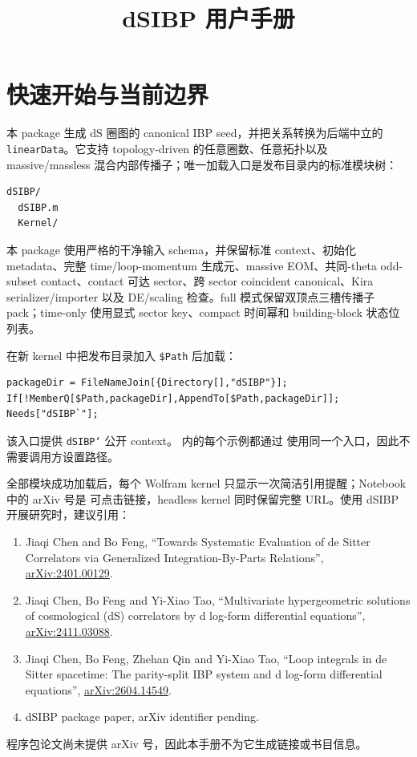 ﻿\documentclass[a4paper,11pt]{article}
\title{dSIBP 用户手册}
\begin{document}
\sloppy
\setcounter{tocdepth}{1}
\maketitle
\newpage

\section{快速开始与当前边界}

本 package 生成 dS 圈图的 canonical IBP seed，并把关系转换为后端中立的 \texttt{linearData}。它支持 topology-driven 的任意圈数、任意拓扑以及 massive/massless 混合内部传播子；唯一加载入口是发布目录内的标准模块树：
\begin{verbatim}
dSIBP/
  dSIBP.m
  Kernel/
\end{verbatim}
本 package 使用严格的干净输入 schema，并保留标准 context、初始化 metadata、完整 time/loop-momentum 生成元、massive EOM、共同-theta odd-subset contact、contact 可达 sector、跨 sector coincident canonical、Kira serializer/importer 以及 DE/scaling 检查。full 模式保留双顶点三槽传播子 pack；time-only 使用显式 sector key、compact 时间幂和 building-block 状态位列表。

在新 kernel 中把发布目录加入 \texttt{\$Path} 后加载：
\begin{verbatim}
packageDir = FileNameJoin[{Directory[],"dSIBP"}];
If[!MemberQ[$Path,packageDir],AppendTo[$Path,packageDir]];
Needs["dSIBP`"];
\end{verbatim}
该入口提供 \texttt{dSIBP`} 公开 context。 内的每个示例都通过
 使用同一个入口，因此不需要调用方设置路径。

全部模块成功加载后，每个 Wolfram kernel 只显示一次简洁引用提醒；Notebook 中的 arXiv 号是
可点击链接，headless kernel 同时保留完整 URL。使用 dSIBP 开展研究时，建议引用：
\begin{enumerate}
  \item Jiaqi Chen and Bo Feng, ``Towards Systematic Evaluation of de Sitter Correlators via Generalized Integration-By-Parts Relations'', \href{https://arxiv.org/abs/2401.00129}{arXiv:2401.00129}.
  \item Jiaqi Chen, Bo Feng and Yi-Xiao Tao, ``Multivariate hypergeometric solutions of cosmological (dS) correlators by d log-form differential equations'', \href{https://arxiv.org/abs/2411.03088}{arXiv:2411.03088}.
  \item Jiaqi Chen, Bo Feng, Zhehan Qin and Yi-Xiao Tao, ``Loop integrals in de Sitter spacetime: The parity-split IBP system and d log-form differential equations'', \href{https://arxiv.org/abs/2604.14549}{arXiv:2604.14549}.
  \item dSIBP package paper, arXiv identifier pending.
\end{enumerate}
程序包论文尚未提供 arXiv 号，因此本手册不为它生成链接或书目信息。
\end{document}
